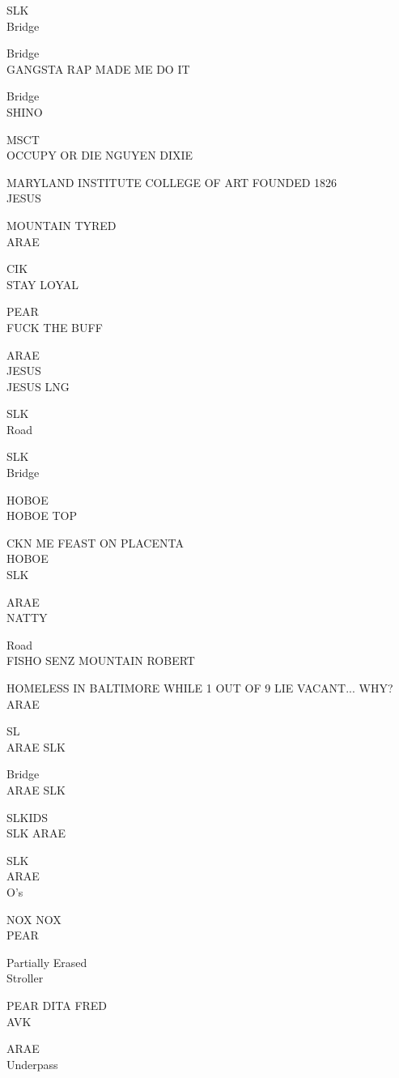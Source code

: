 \documentclass[10pt,letterpaper]{article}
\begin{document}
SLK\\
Bridge

Bridge\\
GANGSTA RAP MADE ME DO IT

Bridge\\
SHINO

MSCT\\
OCCUPY OR DIE NGUYEN DIXIE

MARYLAND INSTITUTE COLLEGE OF ART FOUNDED 1826\\
JESUS

MOUNTAIN TYRED\\
ARAE

CIK\\
STAY LOYAL

PEAR\\
FUCK THE BUFF

ARAE\\
JESUS\\
JESUS LNG

SLK\\
Road

SLK\\
Bridge

HOBOE\\
HOBOE TOP

CKN ME FEAST ON PLACENTA\\
HOBOE\\
SLK

ARAE\\
NATTY

Road\\
FISHO SENZ MOUNTAIN ROBERT

HOMELESS IN BALTIMORE WHILE 1 OUT OF 9 LIE VACANT... WHY?\\
ARAE

SL\\
ARAE SLK

Bridge\\
ARAE SLK

SLKIDS\\
SLK ARAE

SLK\\
ARAE\\
O's

NOX NOX\\
PEAR

Partially Erased\\
Stroller

PEAR DITA FRED\\
AVK

ARAE\\
Underpass
\end{document}

